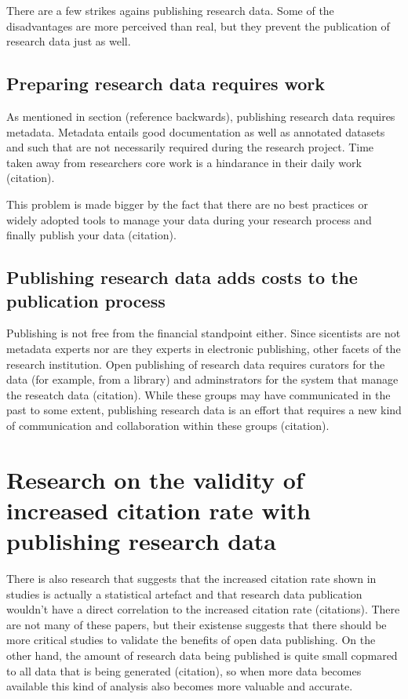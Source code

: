 There are a few strikes agains publishing research data. Some of the
disadvantages are more perceived than real, but they prevent the publication
of research data just as well.

\subsection{Preparing research data requires work}

As mentioned in section (reference backwards), publishing research data
requires metadata. Metadata entails good documentation as well as annotated
datasets and such that are not necessarily required during the research
project. Time taken away from researchers core work is a hindarance in their
daily work (citation).

This problem is made bigger by the fact that there are no best practices or
widely adopted tools to manage your data during your research process and
finally publish your data (citation).

\subsection{Publishing research data adds costs to the publication process}

Publishing is not free from the financial standpoint either. Since sicentists
are not metadata experts nor are they experts in electronic publishing, other
facets of the research institution. Open publishing of research data requires
curators for the data (for example, from a library) and adminstrators for the
system that manage the reseatch data (citation). While these groups may have
communicated in the past to some extent, publishing research data is an effort
that requires a new kind of communication and collaboration within these groups
(citation).

\section[Validity of the benefit research]{Research on the validity of increased citation rate with publishing
research data}

There is also research that suggests that the increased citation rate shown in
studies is actually a statistical artefact and that research data publication
wouldn't have a direct correlation to the increased citation rate (citations).
There are not many of these papers, but their existense suggests that there
should be more critical studies to validate the benefits of open data
publishing. On the other hand, the amount of research data being published
is quite small copmared to all data that is being generated (citation), so
when more data becomes available this kind of analysis also becomes more
valuable and accurate.

